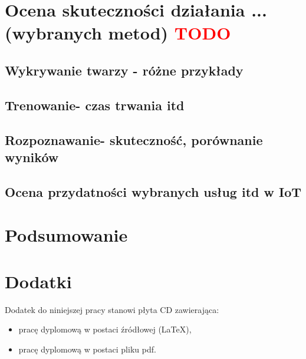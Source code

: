 \documentclass[11pt, a4paper,polish,twoside]{report}
\begin{document}
\chapter{Ocena skuteczności działania ... (wybranych metod) \textcolor{red}{TODO}}
\section{Wykrywanie twarzy - różne przykłady}
\section{Trenowanie- czas trwania itd}
\section{Rozpoznawanie- skuteczność, porównanie wyników}
\section{Ocena przydatności wybranych usług itd w IoT}


\chapter{Podsumowanie}
%


%

\nocite{*}
\printbibliography 


\chapter*{Dodatki}
Dodatek do niniejszej pracy stanowi płyta CD zawierająca:
\begin{itemize}
\item pracę dyplomową w postaci źródłowej (LaTeX),
\item pracę dyplomową w postaci pliku pdf.
\end{itemize}

\newpage
{}	
\listoffigures

\newpage
{}	
\listoftables

\end{document}
